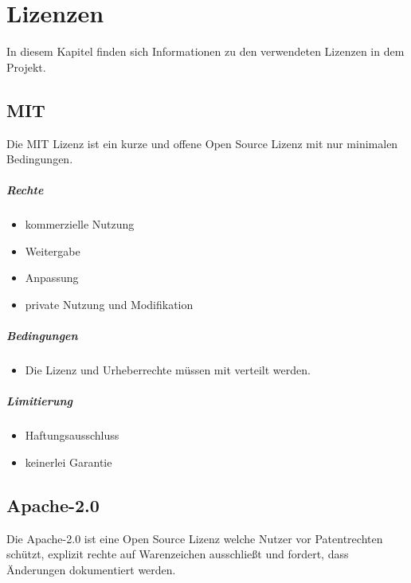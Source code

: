 \chapter{Lizenzen}\label{ch:lizenzen}

In diesem Kapitel finden sich Informationen zu den verwendeten Lizenzen in dem Projekt.

\section{MIT}\label{sec:mit}
Die MIT Lizenz ist ein kurze und offene Open Source Lizenz mit nur minimalen Bedingungen.

\paragraph{Rechte}
\begin{itemize}
    \item kommerzielle Nutzung
    \item Weitergabe
    \item Anpassung
    \item private Nutzung und Modifikation
\end{itemize}

\paragraph{Bedingungen}
\begin{itemize}
    \item Die Lizenz und Urheberrechte müssen mit verteilt werden.
\end{itemize}

\paragraph{Limitierung}
\begin{itemize}
    \item Haftungsausschluss
    \item keinerlei Garantie
\end{itemize}

\section{Apache-2.0}\label{sec:apache-2.0}

Die Apache-2.0 ist eine Open Source Lizenz welche Nutzer vor Patentrechten schützt,
explizit rechte auf Warenzeichen ausschließt und fordert, dass Änderungen dokumentiert werden.

